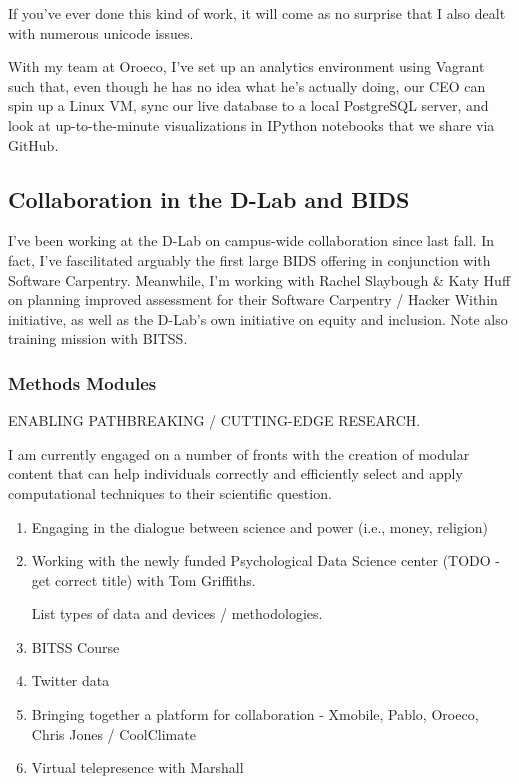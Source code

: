 If you've ever done this kind of work, it will come as no surprise that I also
dealt with numerous unicode issues.

With my team at Oroeco, I've set up an analytics environment using Vagrant such
that, even though he has no idea what he's actually doing, our CEO can spin up a
Linux VM, sync our live database to a local PostgreSQL server, and look at
up-to-the-minute visualizations in IPython notebooks that we share via GitHub.

\subsection*{Collaboration in the D-Lab and BIDS}

I've been working at the D-Lab on campus-wide collaboration since last fall. In
fact, I've fascilitated arguably the first large BIDS offering in conjunction with Software Carpentry.
Meanwhile, I'm working with Rachel Slaybough \& Katy Huff on planning improved
assessment for their Software Carpentry / Hacker Within initiative, as well as
the D-Lab's own initiative on equity and inclusion. Note also training mission
with BITSS.


\subsubsection*{Methods Modules}

ENABLING PATHBREAKING / CUTTING-EDGE RESEARCH.

I am currently engaged on a number of fronts with the creation of modular
content that can help individuals correctly and efficiently select and apply
computational techniques to their scientific question.

\begin{enumerate}
    \item Engaging in the dialogue between science and power (i.e., money,
        religion)

    \item Working with the newly funded Psychological Data Science center (TODO
        - get correct title) with Tom Griffiths.

        List types of data and devices / methodologies.

    \item BITSS Course

    \item Twitter data

    \item Bringing together a platform for collaboration - Xmobile, Pablo,
        Oroeco, Chris Jones / CoolClimate

    \item Virtual telepresence with Marshall
\end{enumerate}

